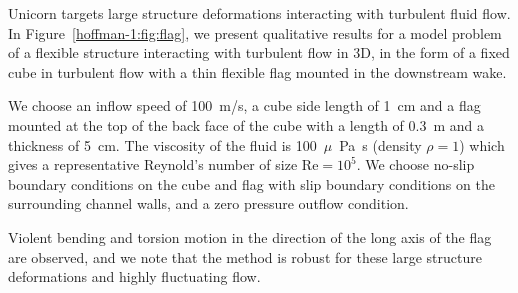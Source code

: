 Unicorn targets large structure deformations interacting with turbulent
fluid flow. In Figure~\ref{hoffman-1:fig:flag}, we present qualitative results for
a model problem of a flexible structure interacting with turbulent flow
in 3D, in the form of a fixed cube in turbulent flow with a thin flexible
flag mounted in the downstream wake.

We choose an inflow speed of 100~m/s, a cube side length of 1~cm and a
flag mounted at the top of the back face of the cube with a length of
0.3~m and a thickness of 5~cm. The viscosity of the fluid is
100~$\mu$~Pa~s (density $\rho=1$) which gives a representative
Reynold's number of size $\mathrm{Re} = 10^5$. We choose no-slip
boundary conditions on the cube and flag with slip boundary conditions
on the surrounding channel walls, and a zero pressure outflow
condition.

Violent bending and torsion motion in the direction of the long axis
of the flag are observed, and we note that the method is robust for
these large structure deformations and highly fluctuating flow.

